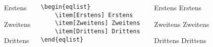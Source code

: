 \begin{frame}[fragile]
\begin{columns}
			\begin{outputbox}
				\begin{eqlist}
					\item Erstens
					\item Zweitens
					\item Drittens 
				\end{eqlist}
			\end{outputbox}
			\begin{lstlisting}
\begin{eqlist}
	\item[Erstens] Erstens
	\item[Zweitens] Zweitens
	\item[Drittens] Drittens 
\end{eqlist}
\end{lstlisting}
\begin{outputbox}
	\begin{eqlist}
		\item[Erstens] Erstens
		\item[Zweitens] Zweitens
		\item[Drittens] Drittens 
	\end{eqlist}
\end{outputbox}			
	\end{columns}
\end{frame}

